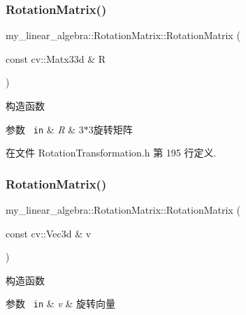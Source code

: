 \subsubsection{\texorpdfstring{RotationMatrix()}{RotationMatrix()}\hspace{0.1cm}{\footnotesize\ttfamily [1/3]}}
{\footnotesize\ttfamily my\+\_\+linear\+\_\+algebra\+::\+Rotation\+Matrix\+::\+Rotation\+Matrix (\begin{DoxyParamCaption}\item[{const cv\+::\+Matx33d \&}]{R }\end{DoxyParamCaption})\hspace{0.3cm}{\ttfamily [inline]}}



构造函数 


\begin{DoxyParams}[1]{参数}
\mbox{\texttt{ in}}  & {\em R} & 3$\ast$3旋转矩阵 \\
\hline
\end{DoxyParams}


在文件 Rotation\+Transformation.\+h 第 195 行定义.

\mbox{\label{classmy__linear__algebra_1_1_rotation_matrix_a4097eaf98ce60df31a53f332dd2a308e}} 
\subsubsection{\texorpdfstring{RotationMatrix()}{RotationMatrix()}\hspace{0.1cm}{\footnotesize\ttfamily [2/3]}}
{\footnotesize\ttfamily my\+\_\+linear\+\_\+algebra\+::\+Rotation\+Matrix\+::\+Rotation\+Matrix (\begin{DoxyParamCaption}\item[{const cv\+::\+Vec3d \&}]{v }\end{DoxyParamCaption})\hspace{0.3cm}{\ttfamily [inline]}}



构造函数 


\begin{DoxyParams}[1]{参数}
\mbox{\texttt{ in}}  & {\em v} & 旋转向量 \\
\hline
\end{DoxyParams}


